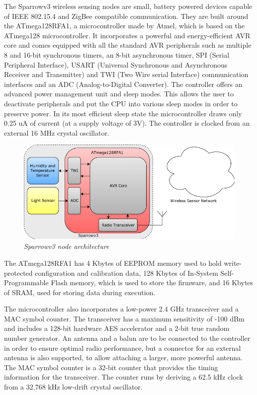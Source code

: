 The Sparrowv3 wireless sensing nodes are small, battery powered devices capable
of IEEE 802.15.4 and ZigBee compatible communication. They are built around the
\mbox{ATmega128RFA1}\cite{atmega128rfa1}, a microcontroller made by Atmel,
which is based on the \mbox{ATmega128} microcontroller. It incorporates a
powerful and energy-efficient AVR core and comes equipped with all the standard
AVR peripherals such as multiple 8 and 16-bit synchronous timers, an 8-bit
asynchronous timer, SPI (Serial Peripheral Interface), USART (Universal
Synchronous and Asynchronous Receiver and Transmitter) and TWI (Two Wire serial
Interface) communication interfaces and an ADC (Analog-to-Digital Converter).
The controller offers an advanced power management unit and sleep modes. This
allows the user to deactivate peripherals and put the CPU into various sleep
modes in order to preserve power. In its most efficient sleep state the
microcontroller draws only 0.25 uA of current (at a supply voltage of 3V). The
controller is clocked from an external 16 MHz crystal oscillator.

\begin{figure}[ht]
	\begin{center}
		\includegraphics[width=\textwidth]{img/sparrowv3_node.pdf}
	\end{center}
	\caption{\small \itshape{Sparrowv3 node architecture}}
\end{figure}

The \mbox{ATmega128RFA1} has 4 Kbytes of EEPROM memory used to hold
write-protected configuration and calibration data, 128 Kbytes of In-System
Self-Programmable Flash memory, which is used to store the firmware, and 16
Kbytes of SRAM, used for storing data during execution.

The microcontroller also incorporates a low-power 2.4 GHz transceiver and a MAC
symbol counter. The transceiver has a maximum sensitivity of -100 dBm and
includes a 128-bit hardware AES accelerator and a 2-bit true random number
generator. An antenna and a balun are to be connected to the controller in
order to ensure optimal radio performance, but a connector for an external
antenna is also supported, to allow attaching a larger, more powerful antenna.
The MAC symbol counter is a 32-bit counter that provides the timing information
for the transceiver. The counter runs by deriving a 62.5 kHz clock from a
32.768 kHz low-drift crystal oscillator. 

